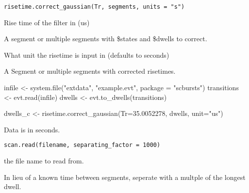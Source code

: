 \documentclass[letterpaper]{book}
\begin{document}
%
\begin{Usage}
\begin{verbatim}
risetime.correct_gaussian(Tr, segments, units = "s")
\end{verbatim}
\end{Usage}
%
\begin{Arguments}
\begin{ldescription}
\item[\code{Tr}] Rise time of the filter in (us)

\item[\code{segments}] A segment or multiple segments with \$states and \$dwells to correct.

\item[\code{units}] What unit the risetime is input in (defaults to seconds)
\end{ldescription}
\end{Arguments}
%
\begin{Value}
A Segment or multiple segments with corrected risetimes.
\end{Value}
%
\begin{Examples}
\begin{ExampleCode}

infile <- system.file("extdata", "example.evt", package = "scbursts")
transitions <- evt.read(infile)
dwells <- evt.to_dwells(transitions)

dwells_c <- risetime.correct_gaussian(Tr=35.0052278, dwells, unit="us")

\end{ExampleCode}
\end{Examples}
%
\begin{Description}\relax
Data is in seconds.
\end{Description}
%
\begin{Usage}
\begin{verbatim}
scan.read(filename, separating_factor = 1000)
\end{verbatim}
\end{Usage}
%
\begin{Arguments}
\begin{ldescription}
\item[\code{filename, }] the file name to read from.

\item[\code{separating\_factor}] In lieu of a known time between segments, 
seperate with a multple of the longest dwell.
\end{ldescription}
\end{Arguments}
\end{document}
